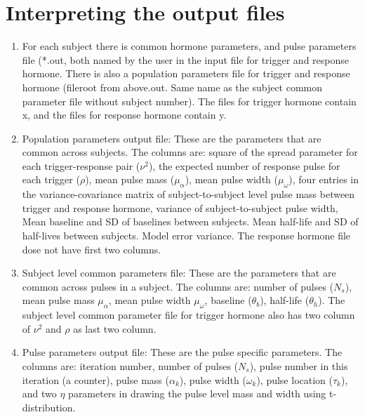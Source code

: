 \documentclass[12pt, oneside]{article}   	%
\begin{document}
\section{Interpreting the output files}
\begin{enumerate}
\item For each subject there is common hormone parameters, and pulse parameters file (*.out, both named by the user in the input file for trigger and response hormone. There is also a population parameters file for trigger and response hormone (fileroot from above.out. Same name as the subject common parameter file without subject number). The files for trigger hormone contain x, and the files for response hormone contain y.
\item Population parameters output file: These are the parameters that are common across subjects.  The columns are: square of the spread parameter for each trigger-response pair ($\nu^2$), the expected number of response pulse for each trigger ($\rho$), mean pulse mass ($\mu_\alpha$), mean pulse width ($\mu_\omega$), four entries in the variance-covariance matrix of subject-to-subject level pulse mass between trigger and response hormone, variance of subject-to-subject pulse width, Mean baseline and SD of baselines between subjects. Mean half-life and SD of half-lives between subjects. Model error variance. The response hormone file dose not have first two columns.
\item Subject level common parameters file: These are the parameters that are common across pulses in a subject. The columns are: number of pulses ($N_s$), mean pulse mass $\mu_{\alpha}$, mean pulse width $\mu_{\omega}$, baseline ($\theta_b$), half-life ($\theta_h$). The subject level common parameter file for trigger hormone also has two column of $\nu^2$ and $\rho$ as last two column.
\item Pulse parameters output file: These are the pulse specific parameters. The columns are:  iteration number, number of pulses ($N_s$), pulse number in this iteration (a counter), pulse mass ($\alpha_k$), pulse width ($\omega_k$), pulse location ($\tau_k$), and two $\eta$ parameters in drawing the pulse level mass and width using t-distribution.
\end{enumerate}
\end{document}
